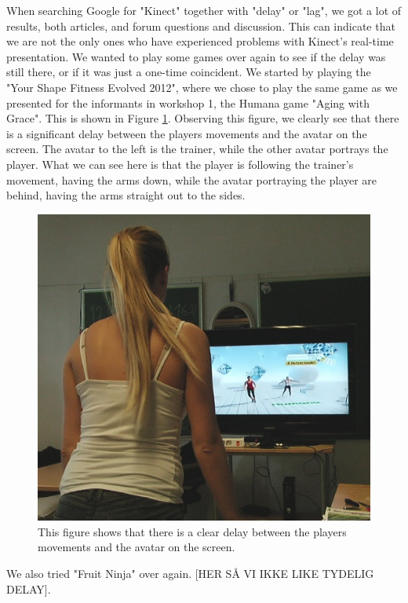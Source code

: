 When searching Google for "Kinect" together with "delay" or "lag", we got a lot of results, both articles, and forum questions and discussion. This can indicate that we are not the only ones who have experienced problems with Kinect's real-time presentation. We wanted to play some games over again to see if the delay was still there, or if it was just a one-time coincident. We started by playing the "Your Shape Fitness Evolved 2012", where we chose to play the same game as we presented for the informants in workshop 1, the Humana game "Aging with Grace". This is shown in Figure \ref{fig:remakeDelay}. Observing this figure, we clearly see that there is a significant delay between the players movements and the avatar on the screen. The avatar to the left is the trainer, while the other avatar portrays the player. What we can see here is that the player is following the trainer's movement, having the arms down, while the avatar portraying the player are behind, having the arms straight out to the sides.

\begin{figure} [H]
\centering
\includegraphics[scale=0.6]{kineDelay.jpg}
\caption[Kinect sensor delay]{This figure shows that there is a clear delay between the players movements and the avatar on the screen.}
\label{fig:remakeDelay}
\end{figure} 

We also tried "Fruit Ninja" over again. [HER SÅ VI IKKE LIKE TYDELIG DELAY].

